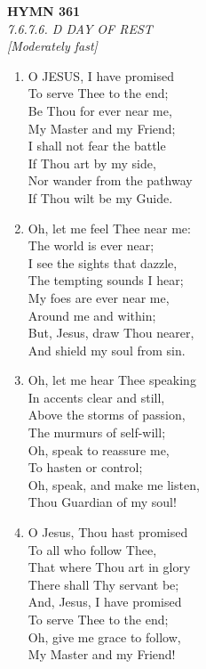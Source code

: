 \newpage
\begin{center}
    {\Large \textbf{HYMN 361}}
    \\
    \textit{7.6.7.6. D DAY OF REST}
    \\
    \textit{\small [Moderately fast]}
\end{center}
\vspace{1em}

\begin{enumerate}
    \item O JESUS, I have promised \\
        To serve Thee to the end; \\
        Be Thou for ever near me, \\
        My Master and my Friend; \\
        I shall not fear the battle \\
        If Thou art by my side, \\
        Nor wander from the pathway \\
        If Thou wilt be my Guide.

    \item Oh, let me feel Thee near me: \\
        The world is ever near; \\
        I see the sights that dazzle, \\
        The tempting sounds I hear; \\
        My foes are ever near me, \\
        Around me and within; \\
        But, Jesus, draw Thou nearer, \\
        And shield my soul from sin.

    \item Oh, let me hear Thee speaking \\
        In accents clear and still, \\
        Above the storms of passion, \\
        The murmurs of self-will; \\
        Oh, speak to reassure me, \\
        To hasten or control; \\
        Oh, speak, and make me listen, \\
        Thou Guardian of my soul!

    \item O Jesus, Thou hast promised \\
        To all who follow Thee, \\
        That where Thou art in glory \\
        There shall Thy servant be; \\
        And, Jesus, I have promised \\
        To serve Thee to the end; \\
        Oh, give me grace to follow, \\
        My Master and my Friend!


\end{enumerate}
